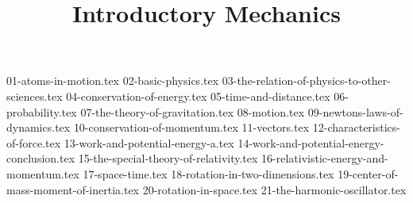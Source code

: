 

\usepackage{import}

\newcommand\bookmode{}


  \title{Introductory Mechanics}
  \maketitle

  {01-atoms-in-motion.tex}
  \clearpage
  {02-basic-physics.tex}
  \clearpage
  {03-the-relation-of-physics-to-other-sciences.tex}
  \clearpage
  {04-conservation-of-energy.tex}
  \clearpage
  {05-time-and-distance.tex}
  \clearpage
  {06-probability.tex}
  \clearpage
  {07-the-theory-of-gravitation.tex}
  \clearpage
  {08-motion.tex}
  \clearpage
  {09-newtons-laws-of-dynamics.tex}
  \clearpage
  {10-conservation-of-momentum.tex}
  \clearpage
  {11-vectors.tex}
  \clearpage
  {12-characteristics-of-force.tex}
  \clearpage
  {13-work-and-potential-energy-a.tex}
  \clearpage
  {14-work-and-potential-energy-conclusion.tex}
  \clearpage
  {15-the-special-theory-of-relativity.tex}
  \clearpage
  {16-relativistic-energy-and-momentum.tex}
  \clearpage
  {17-space-time.tex}
  \clearpage
  {18-rotation-in-two-dimensions.tex}
  \clearpage
  {19-center-of-mass-moment-of-inertia.tex}
  \clearpage
  {20-rotation-in-space.tex}
  \clearpage
  {21-the-harmonic-oscillator.tex}

